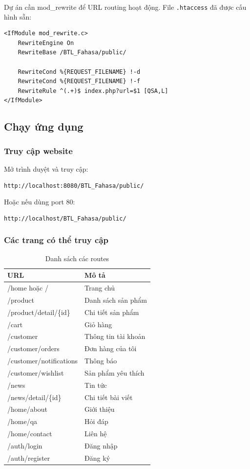 Dự án cần mod\_rewrite để URL routing hoạt động. File \texttt{.htaccess} đã được cấu hình sẵn:

\begin{verbatim}
<IfModule mod_rewrite.c>
    RewriteEngine On
    RewriteBase /BTL_Fahasa/public/
    
    RewriteCond %{REQUEST_FILENAME} !-d
    RewriteCond %{REQUEST_FILENAME} !-f
    RewriteRule ^(.+)$ index.php?url=$1 [QSA,L]
</IfModule>
\end{verbatim}

\subsection{Chạy ứng dụng}

\subsubsection{Truy cập website}

Mở trình duyệt và truy cập:
\begin{verbatim}
http://localhost:8080/BTL_Fahasa/public/
\end{verbatim}

Hoặc nếu dùng port 80:
\begin{verbatim}
http://localhost/BTL_Fahasa/public/
\end{verbatim}

\subsubsection{Các trang có thể truy cập}

\begin{table}[H]
\centering
\begin{tabular}{|l|l|}
\hline
\textbf{URL} & \textbf{Mô tả} \\
\hline
/home hoặc / & Trang chủ \\
/product & Danh sách sản phẩm \\
/product/detail/\{id\} & Chi tiết sản phẩm \\
/cart & Giỏ hàng \\
/customer & Thông tin tài khoản \\
/customer/orders & Đơn hàng của tôi \\
/customer/notifications & Thông báo \\
/customer/wishlist & Sản phẩm yêu thích \\
/news & Tin tức \\
/news/detail/\{id\} & Chi tiết bài viết \\
/home/about & Giới thiệu \\
/home/qa & Hỏi đáp \\
/home/contact & Liên hệ \\
/auth/login & Đăng nhập \\
/auth/register & Đăng ký \\
\hline
\end{tabular}
\caption{Danh sách các routes}
\label{tab:routes}
\end{table}

